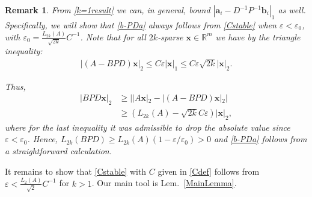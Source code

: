 \documentclass[journal, twocolumn]{IEEEtran}
\newtheorem{remark}{Remark}
\begin{document}
\begin{remark}\label{b-PDaProof}
From \eqref{k=1result} we can, in general, bound $|\mathbf{a}_i - D^{-1}P^{-1}\mathbf{b}_i|_1$ as well. Specifically, we will show that \eqref{b-PDa} always follows from \eqref{Cstable} when $\varepsilon < \varepsilon_0$, with $\varepsilon_0 = \frac{L_{2k}(A)}{\sqrt{2k}}C^{-1}$. Note that for all $2k$-sparse $\mathbf{x} \in \mathbb{R}^m$ we have by the triangle inequality:
\begin{align*}
|(A-BPD)\mathbf{x}|_2 
\leq C\varepsilon|\mathbf{x}|_1
\leq C \varepsilon \sqrt{2k}  |\mathbf{x}|_2.
\end{align*}

Thus,
\begin{align*}
|BPD\mathbf{x}|_2 
&\geq | |A\mathbf{x}|_2 - |(A-BPD)\mathbf{x}|_2 | \\
&\geq (L_{2k}(A) - \sqrt{2k}C\varepsilon ) |\mathbf{x}|_2,
\end{align*}
%
where for the last inequality it was admissible to drop the absolute value since $\varepsilon < \varepsilon_0$. Hence, $L_{2k}(BPD) \geq L_{2k}(A)\left( 1 - \varepsilon/\varepsilon_0 \right) > 0$ and \eqref{b-PDa} follows from a straightforward calculation.
\end{remark}

It remains to show that \eqref{Cstable} with $C$ given in \eqref{Cdef} follows from $\varepsilon < \frac{L_2(A)}{\sqrt{2}}C^{-1}$ for $k > 1$. Our main tool is Lem.~\ref{MainLemma}.
\end{document}
